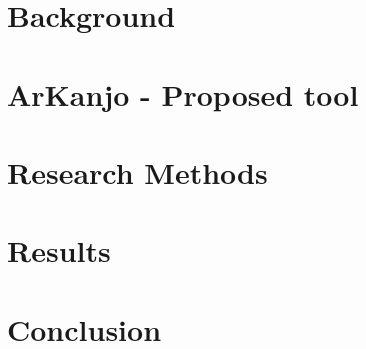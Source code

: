 
\en

\chapter{Background}
\label{cha:back}


\par

\par

\par

\par
\chapter{ArKanjo - Proposed tool}
\label{cha:tool}


\par

\par

\par

\chapter{Research Methods}
\label{cha:method}


\par

\chapter{Results}
\label{cha:results}



\chapter{Conclusion}
\label{cha:conclusion}




